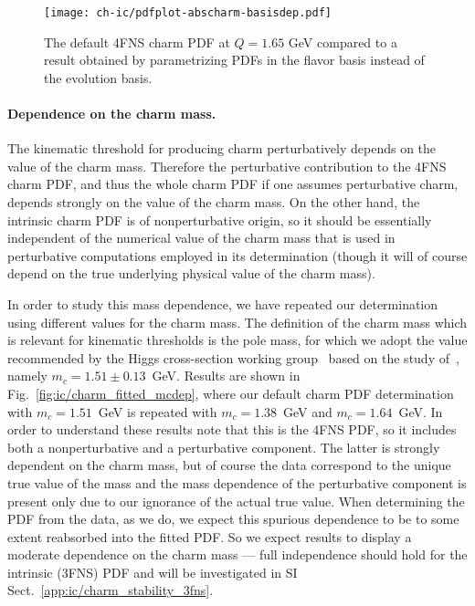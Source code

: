 \begin{figure}[t!]
  \begin{center}
    \texttt{[image: ch-ic/pdfplot-abscharm-basisdep.pdf]}
    \caption{\small The default 4FNS charm PDF at $Q=1.65$ GeV
    compared to a result obtained by parametrizing PDFs in the flavor
    basis instead of the evolution basis. 
  \label{fig:ic/charm_basisdep} }
\end{center}
\end{figure}

\paragraph{Dependence on the charm mass.}
%
The kinematic threshold for producing charm perturbatively depends on
the value of the charm mass. Therefore the perturbative contribution
to the 4FNS charm PDF, and thus the whole charm PDF if one assumes
perturbative charm, depends strongly on the value of the charm
mass.
On the other hand, the intrinsic charm PDF is of nonperturbative
origin, so it should be essentially independent of the numerical value of the
charm mass that is used in  perturbative computations employed in  its 
determination (though it will of course depend on the true underlying 
physical value of the charm mass).

In order to study this mass dependence, we have repeated our determination using different values for the charm mass.
The definition of the charm mass which is relevant for kinematic
thresholds is the pole mass, for which we adopt the value recommended
by the Higgs cross-section working group~\cite{deFlorian:2016spz}
based on the study of~\cite{Bauer:2004ve}, namely
 $m_c = 1.51 \pm 0.13$~GeV. 
%
Results are shown in Fig.~\ref{fig:ic/charm_fitted_mcdep}, where
our default charm PDF determination with  $m_c = 1.51$~GeV is
repeated with $m_c=1.38$~GeV and
$m_c=1.64$~GeV.
%
In order to understand these results note that this is
the 4FNS PDF, so it includes 
both a nonperturbative and a perturbative component. The latter is
strongly dependent on the charm mass, but of course the data
correspond to the unique true value of the mass and the mass
dependence of the perturbative component is present only due to our
ignorance of the actual true value. When determining the PDF from the
data, as we do, we expect this spurious dependence to be to some extent
reabsorbed into the fitted PDF. So we expect results to display a
moderate dependence on the charm mass --- full independence should
hold for the intrinsic (3FNS) PDF and will be investigated in
SI Sect.~\ref{app:ic/charm_stability_3fns}. 

